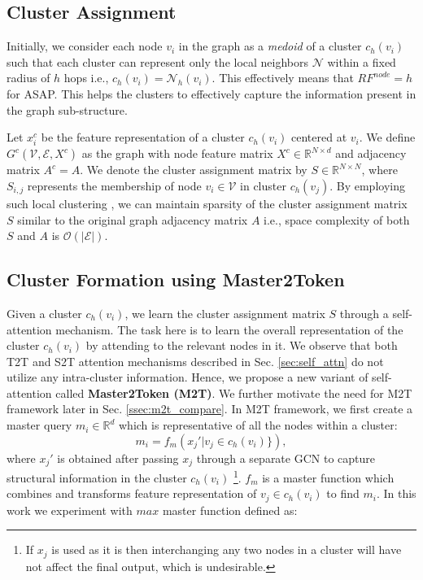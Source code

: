 \documentclass[letterpaper]{article} \usepackage{aaai20}  \usepackage{times}  \usepackage{helvet} \usepackage{courier}  \usepackage[hyphens]{url}  \usepackage{graphicx} \urlstyle{rm} \def\UrlFont{\rm}  \usepackage{graphicx}  \frenchspacing  \setlength{\pdfpagewidth}{8.5in}  \setlength{\pdfpageheight}{11in}
\begin{document}
\subsection{Cluster Assignment}
\label{ssec:cluster-assignment}
Initially, we consider each node $v_{i}$ in the graph as a \textit{medoid} of a cluster $c_{h}(v_{i})$ such that each cluster can represent only the local neighbors $\mathcal{N}$ within a fixed radius of $h$ hops i.e., $c_{h}(v_{i}) = \mathcal{N}_h(v_{i})$. This effectively means that $RF^{node}=h$ for ASAP. This helps the clusters to effectively capture the information present in the graph sub-structure.



\noindent Let $x_{i}^{c}$ be the feature representation of a cluster $c_{h}(v_{i})$ centered at $v_i$. We define $G^{c}(\mathcal{V}, \mathcal{E}, X^c)$ as the graph with node feature matrix $X^{c} \in \mathbb{R}^{N \times d}$ and adjacency matrix $A^{c} = A$. We denote the cluster assignment matrix by $S \in \mathbb{R}^{N \times N}$, where $S_{i,j}$ represents the membership of node $v_{i} \in \mathcal{V}$ in cluster $c_{h}(v_{j})$. By employing such local clustering \cite{satu}, we can maintain sparsity of the cluster assignment matrix $S$ similar to the original graph adjacency matrix $A$ i.e., space complexity of both $S$ and $A$ is $\mathcal{O}(|\mathcal{E}|)$.

\subsection{Cluster Formation using Master2Token}
\label{ssec:node-aggregation}
Given a cluster $c_{h}(v_{i})$, we learn the cluster assignment matrix $S$ through a self-attention mechanism. The task here is to learn the overall representation of the cluster $c_{h}(v_{i})$ by attending to the relevant nodes in it.  We observe that both T2T and S2T attention mechanisms described in Sec. \ref{sec:self_attn} do not utilize any intra-cluster information. Hence, we propose a new variant of self-attention called \textbf{Master2Token (M2T)}. We further motivate the need for M2T framework later in Sec. \ref{ssec:m2t_compare}. In M2T framework, we first create a master query $m_{i} \in \mathbb{R}^{d}$ which is representative of all the nodes within a cluster:
\begin{equation}
    m_{i} = f_{m}(x_j' | v_j \in c_h(v_i) \}),
\end{equation}
where $x_j'$ is obtained after passing $x_j$ through a separate GCN to capture structural information in the cluster $c_{h}(v_{i})$ \footnote{If $x_j$ is used as it is then interchanging any two nodes in a cluster will have not affect the final output, which is undesirable.}. $f_{m}$ is a master function which combines and transforms feature representation of $v_{j}\in c_{h}(v_{i})$ to find $m_i$. In this work we experiment with $max$ master function defined as:
\end{document}
